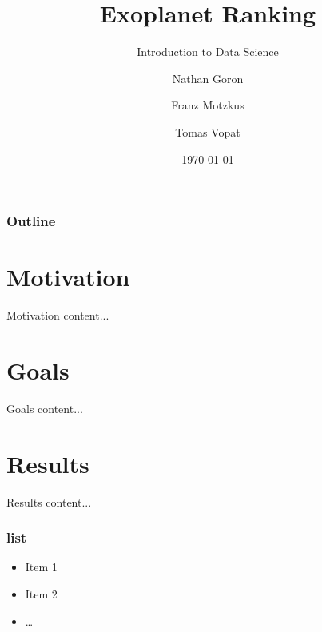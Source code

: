 \documentclass[aspectratio=169]{beamer}
\title{Exoplanet Ranking}
\subtitle{Introduction to Data Science}
\author[Goron, Motzkus, Vopat]{Nathan Goron \and Franz Motzkus \and Tomas Vopat}
\institute[HY]{University of Helsinki}
\date{\today}
\begin{document}
\begin{frame}
    \titlepage
\end{frame}

\begin{frame}
    \frametitle{Outline}
    \tableofcontents
\end{frame}

\section{Motivation}

\begin{frame}{Motivation}
    content...
\end{frame}

\section{Goals}

\begin{frame}{Goals}
    content...
\end{frame}

\section{Results}

\begin{frame}{Results}
    content...
\end{frame}


\begin{frame}
    \frametitle{list}

    \begin{itemize}
        \item Item 1
        \item Item 2
        \item \dots
    \end{itemize}

\end{frame}

\end{document}
